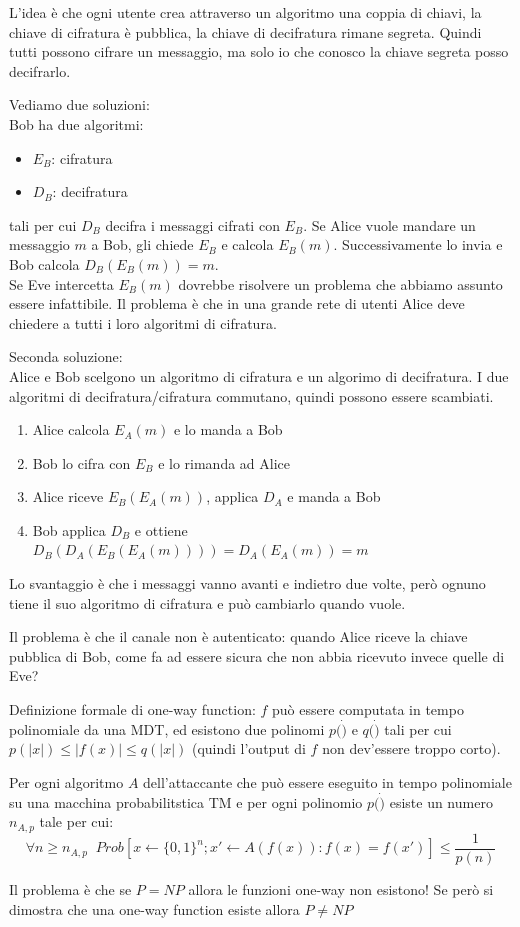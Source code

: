 L'idea è che ogni utente crea attraverso un algoritmo una coppia di chiavi, la chiave di cifratura è pubblica, la chiave di decifratura rimane segreta. Quindi tutti possono cifrare un messaggio, ma solo io che conosco la chiave segreta posso decifrarlo.


Vediamo due soluzioni:\\
Bob ha due algoritmi:
\begin{itemize}
	\item $E_B$: cifratura
	\item $D_B$: decifratura
\end{itemize}
tali per cui $D_B$ decifra i messaggi cifrati con $E_B$.
Se Alice vuole mandare un messaggio $m$ a Bob, gli chiede $E_B$ e calcola $E_B(m)$. Successivamente lo invia e Bob calcola $D_B(E_B(m)) = m$.\\
Se Eve intercetta $E_B(m)$ dovrebbe risolvere un problema che abbiamo assunto essere infattibile.
Il problema è che in una grande rete di utenti Alice deve chiedere a tutti i loro algoritmi di cifratura.

Seconda soluzione:\\
Alice e Bob scelgono un algoritmo di cifratura e un algorimo di decifratura.
I due algoritmi di decifratura/cifratura commutano, quindi possono essere scambiati.
\begin{enumerate}
	\item Alice calcola $E_A(m)$ e lo manda a Bob
	\item Bob lo cifra con $E_B$ e lo rimanda ad Alice
	\item Alice riceve $E_B(E_A(m))$, applica $D_A$ e manda a Bob
	\item Bob applica $D_B$ e ottiene $D_B(D_A(E_B(E_A(m)))) = D_A(E_A(m)) = m$
\end{enumerate}
Lo svantaggio è che i messaggi vanno avanti e indietro due volte, però ognuno tiene il suo algoritmo di cifratura e può cambiarlo quando vuole.

Il problema è che il canale non è autenticato: quando Alice riceve la chiave pubblica di Bob, come fa ad essere sicura che non abbia ricevuto invece quelle di Eve?

Definizione formale di one-way function:
$f$ può essere computata in tempo polinomiale da una MDT, ed esistono due polinomi $p(\dot)$ e $q(\dot)$ tali per cui $p(|x|) \leq |f(x)| \leq q(|x|)$ (quindi l'output di $f$ non dev'essere troppo corto).

Per ogni algoritmo $A$ dell'attaccante che può essere eseguito in tempo polinomiale su una macchina probabilitstica TM e per ogni polinomio $p(\dot)$ esiste un numero $n_{A,p}$ tale per cui:
\begin{equation*}
\forall n \geq n_{A,p} \; \; Prob[x \leftarrow \{0,1\}^n; x'\leftarrow A(f(x)):f(x)=f(x')] \leq \frac1{p(n)}
\end{equation*}

Il problema è che se $P=NP$ allora le funzioni one-way non esistono! Se però si dimostra che una one-way function esiste allora $P \neq NP$
